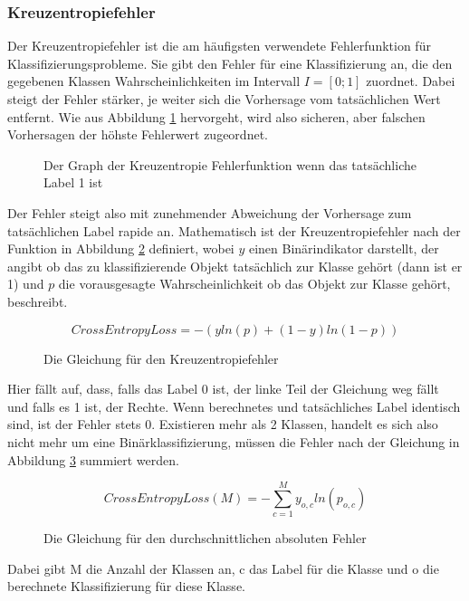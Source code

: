 \documentclass{article}
\begin{document}
\subsubsection{Kreuzentropiefehler}
Der Kreuzentropiefehler ist die am häufigsten verwendete Fehlerfunktion für Klassifizierungsprobleme. Sie gibt den Fehler für eine Klassifizierung an, die den gegebenen Klassen Wahrscheinlichkeiten im Intervall $I=[0;1]$ zuordnet. Dabei steigt der Fehler stärker, je weiter sich die Vorhersage vom tatsächlichen Wert entfernt. Wie aus Abbildung \ref{CEL_Graph} hervorgeht, wird also sicheren, aber falschen Vorhersagen der höhste Fehlerwert zugeordnet. 
\begin{figure}[h]
	\begin{center}
	\end{center}
	\caption{Der Graph der Kreuzentropie Fehlerfunktion wenn das tatsächliche Label 1 ist}
	\label{CEL_Graph}
\end{figure}
\newline
Der Fehler steigt also mit zunehmender Abweichung der Vorhersage zum tatsächlichen Label rapide an.\newline 
Mathematisch ist der Kreuzentropiefehler nach der Funktion in Abbildung \ref{CEL_Function} definiert, wobei $y$ einen Binärindikator darstellt, der angibt ob das zu klassifizierende Objekt tatsächlich zur Klasse gehört (dann ist er 1) und $p$ die vorausgesagte Wahrscheinlichkeit ob das Objekt zur Klasse gehört, beschreibt.
\begin{figure}[h]
	\begin{equation*}
	CrossEntropyLoss=-(yln(p)+(1-y)ln(1-p))
	\end{equation*}
	\caption{Die Gleichung für den Kreuzentropiefehler}
	\label{CEL_Function}
\end{figure}
\newline
Hier fällt auf, dass, falls das Label 0 ist, der linke Teil der Gleichung weg fällt und falls es 1 ist, der Rechte. Wenn berechnetes und tatsächliches Label identisch sind, ist der Fehler stets 0.\newline
Existieren mehr als 2 Klassen, handelt es sich also nicht mehr um eine Binärklassifizierung, müssen die Fehler nach der Gleichung in Abbildung \ref{CEL_Finction_cummulative} summiert werden.
\begin{figure}[h]
	\begin{equation*}
	CrossEntropyLoss(M)=-\sum\limits_{c=1}^My_{o,c}ln(p_{o,c})
	\end{equation*}
	\caption{Die Gleichung für den durchschnittlichen absoluten Fehler}
	\label{CEL_Finction_cummulative}
\end{figure}
\newline
Dabei gibt M die Anzahl der Klassen an, c das Label für die Klasse und o die berechnete Klassifizierung für diese Klasse.
\end{document}
